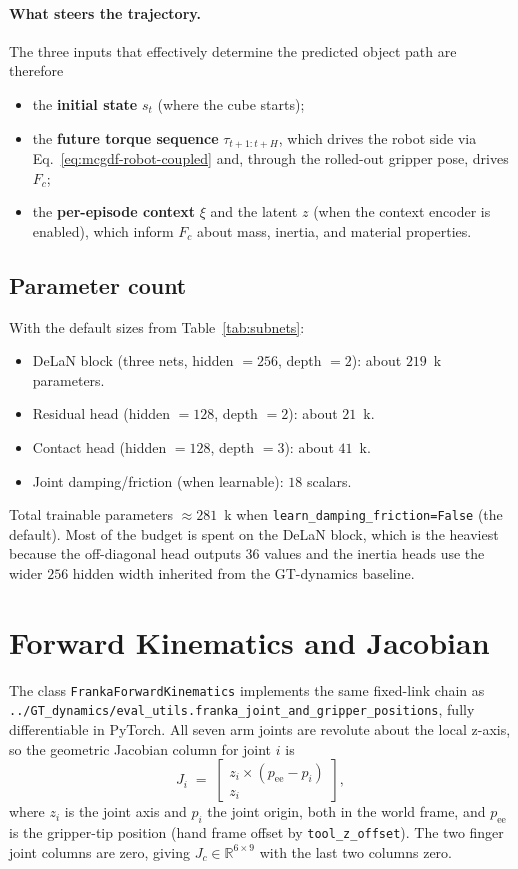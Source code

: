 \documentclass[11pt]{article}
\begin{document}
\paragraph{What steers the trajectory.}
The three inputs that effectively determine the predicted object path are
therefore
\begin{itemize}
  \item the \textbf{initial state} $s_t$ (where the cube starts);
  \item the \textbf{future torque sequence} $\tau_{t+1:t+H}$, which drives
    the robot side via Eq.~\eqref{eq:mcgdf-robot-coupled} and, through the
    rolled-out gripper pose, drives $F_c$;
  \item the \textbf{per-episode context} $\xi$ and the latent $z$
    (when the context encoder is enabled), which inform $F_c$ about
    mass, inertia, and material properties.
\end{itemize}

\subsection{Parameter count}

With the default sizes from Table~\ref{tab:subnets}:
\begin{itemize}
  \item DeLaN block (three nets, hidden $=256$, depth $=2$): about
    $219$~k parameters.
  \item Residual head (hidden $=128$, depth $=2$): about $21$~k.
  \item Contact head (hidden $=128$, depth $=3$): about $41$~k.
  \item Joint damping/friction (when learnable): $18$ scalars.
\end{itemize}
Total trainable parameters $\approx 281$~k when
\texttt{learn\_damping\_friction=False} (the default). Most of the budget
is spent on the DeLaN block, which is the heaviest because the
off-diagonal head outputs $36$ values and the inertia heads use the wider
$256$ hidden width inherited from the GT-dynamics baseline.

\section{Forward Kinematics and Jacobian}

The class \texttt{FrankaForwardKinematics} implements the same fixed-link
chain as
\texttt{../GT\_dynamics/eval\_utils.franka\_joint\_and\_gripper\_positions},
fully differentiable in PyTorch.  All seven arm joints are revolute about
the local z-axis, so the geometric Jacobian column for joint $i$ is
\begin{equation}
  J_i \;=\; \begin{bmatrix} z_i \times (p_{\mathrm{ee}} - p_i) \\ z_i \end{bmatrix},
\end{equation}
where $z_i$ is the joint axis and $p_i$ the joint origin, both in the world
frame, and $p_{\mathrm{ee}}$ is the gripper-tip position (hand frame offset
by \texttt{tool\_z\_offset}).  The two finger joint columns are zero,
giving $J_c \in \mathbb{R}^{6\times 9}$ with the last two columns zero.
\end{document}
